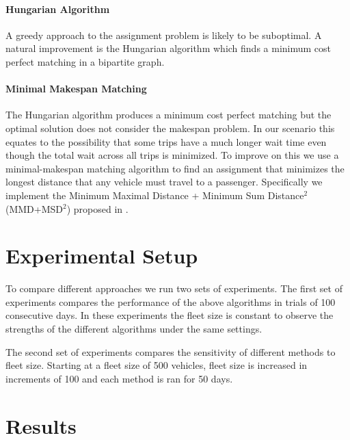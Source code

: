 \documentclass[letterpaper]{article}
\begin{document}
\paragraph{Hungarian Algorithm}
A greedy approach to the assignment problem is likely to be suboptimal. A natural improvement is the Hungarian algorithm \cite{kuhn1955hungarian} which finds a minimum cost perfect matching in a bipartite graph. 

\paragraph{Minimal Makespan Matching}
The Hungarian algorithm produces a minimum cost perfect matching but the optimal solution does not consider the makespan problem. In our scenario this equates to the possibility that some trips have a much longer wait time even though the total wait across all trips is minimized. To improve on this we use a minimal-makespan matching algorithm to find an assignment that minimizes the longest distance that any vehicle must travel to a passenger. Specifically we implement the Minimum Maximal Distance + Minimum Sum Distance$^2$ (MMD+MSD$^2$) proposed in \cite{macalpine2015scram}.

\section{Experimental Setup}
To compare different approaches we run two sets of experiments. The first set of experiments compares the performance of the above algorithms in trials of 100 consecutive days. In these experiments the fleet size is constant to observe the strengths of the different algorithms under the same settings.


The second set of experiments compares the sensitivity of different methods to fleet size. Starting at a fleet size of 500 vehicles, fleet size is increased in increments of 100 and each method is ran for 50 days.

\section{Results}




\end{document}
